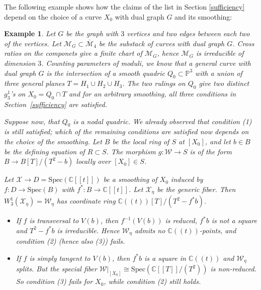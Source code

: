 \documentclass[11pt]{amsart}
\newtheorem{question}{Question}
\newtheorem{example}[theorem]{Example}
\newcommand{\cX}{\mathcal X}
\begin{document}
The following example shows how the claims of the list in Section \ref{sufficiency} depend on the choice of a curve $X_0$ with dual graph $G$ and its smoothing: 

\begin{example}
Let $G$ be the graph with $3$ vertices and two edges between each two of the vertices. Let $\mathcal{M}_G\subset\overline{\mathcal{M}}_4$ be the substack of curves with dual graph $G$. Cross ratios on the componets give a finite chart of $\mathcal{M}_G$, hence $\mathcal{M}_G$ is irreducible of dimension $3$. Counting parameters of moduli, we know that a general curve with dual graph $G$ is the intersection of a smooth quadric $Q_0\subset \mathbb{P}^3$ with a union of three general planes $T=H_1\cup H_2\cup H_3$. The two rulings on $Q_0$ give two distinct $g_3^1$'s on $X_0=Q_0\cap T$ and for an arbitrary smoothing, all three conditions in Section~\ref{sufficiency} are satisfied.
 
Suppose now, that $Q_0$ is a nodal quadric. We already observed that condition (1) is still satisfied; which of the remaining conditions are satisfied now depends on the choice of the smoothing. Let $B$ be the local ring of $S$ at $[X_0]$, and let $b\in B$ be the defining equation of $R\subset S$.
The morphism $g\colon \mathcal{W}\to S$ is of the form $B\to B[T]/(T^2-b)$ locally over $[X_0]\in S$.

Let $\mathcal{X}\to D=\mathrm{Spec}(\mathbb{C}[[t]])$ be a smoothing of $X_0$ induced by $f\colon D\to \mathrm{Spec}(B)$ with $f^*\colon B\to\mathbb{C}[[t]]$. Let $\cX_\eta$ be the generic fiber. Then $W_3^1(\cX_\eta)=\mathcal{W}_\eta$ has coordinate ring $\mathbb{C}((t))[T]/(T^2-f^*b)$.
\begin{itemize}[leftmargin=*]
\item If $f$ is transversal to $V(b)$, then $f^{-1}(V(b))$ is reduced, $f^*b$ is not a square and $T^2-f^*b$ is irreducible. Hence $\mathcal{W}_\eta$
admits no $\mathbb{C}((t))$-points, and condition (2) (hence also (3)) fails. 
\item If $f$ is simply tangent to $V(b)$, then $f^*b$ is a square in $\mathbb{C}((t))$ and $\mathcal{W}_\eta$ splits. But the special fiber $\mathcal{W}|_{[X_0]}\cong\mathrm{Spec}(\mathbb{C}[[T]]/(T^2))$ is non-reduced. So condition (3) fails for $X_0$, while condition (2) still holds. 
\end{itemize}
\end{example}




\end{document}
